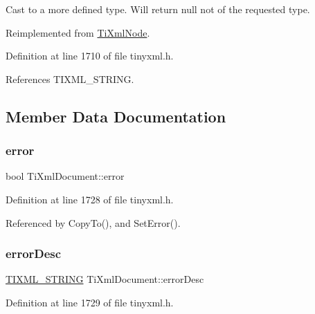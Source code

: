 Cast to a more defined type. Will return null not of the requested type. 



Reimplemented from \hyperlink{class_ti_xml_node_a6a4c8ac28ee7a745d059db6691e03bae}{Ti\+Xml\+Node}.



Definition at line 1710 of file tinyxml.\+h.



References T\+I\+X\+M\+L\+\_\+\+S\+T\+R\+I\+NG.



\subsection{Member Data Documentation}
\hypertarget{class_ti_xml_document_a1ff6a063602f31acae6f37fc049d8bbd}{}\label{class_ti_xml_document_a1ff6a063602f31acae6f37fc049d8bbd} 
\subsubsection{\texorpdfstring{error}{error}}
{\footnotesize\ttfamily bool Ti\+Xml\+Document\+::error\hspace{0.3cm}{\ttfamily [private]}}



Definition at line 1728 of file tinyxml.\+h.



Referenced by Copy\+To(), and Set\+Error().

\hypertarget{class_ti_xml_document_a2da9a95ba3f9c895a8d7f4de7122a642}{}\label{class_ti_xml_document_a2da9a95ba3f9c895a8d7f4de7122a642} 
\subsubsection{\texorpdfstring{error\+Desc}{errorDesc}}
{\footnotesize\ttfamily \hyperlink{tinyxml_8h_a92bada05fd84d9a0c9a5bbe53de26887}{T\+I\+X\+M\+L\+\_\+\+S\+T\+R\+I\+NG} Ti\+Xml\+Document\+::error\+Desc\hspace{0.3cm}{\ttfamily [private]}}



Definition at line 1729 of file tinyxml.\+h.



